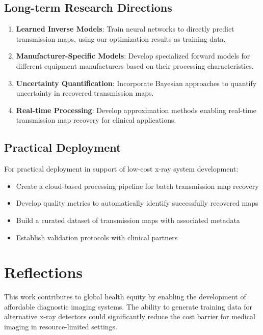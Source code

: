 \documentclass[nomenclature, english, bibtex]{kththesis}
\numberwithin{listing}{chapter}
\begin{document}
\subsection{Long-term Research Directions}
\begin{enumerate}
    \item \textbf{Learned Inverse Models}: Train neural networks to directly predict transmission maps, using our optimization results as training data.

    \item \textbf{Manufacturer-Specific Models}: Develop specialized forward models for different equipment manufacturers based on their processing characteristics.

    \item \textbf{Uncertainty Quantification}: Incorporate Bayesian approaches to quantify uncertainty in recovered transmission maps.

    \item \textbf{Real-time Processing}: Develop approximation methods enabling real-time transmission map recovery for clinical applications.
\end{enumerate}

\subsection{Practical Deployment}
For practical deployment in support of low-cost x-ray system development:
\begin{itemize}
    \item Create a cloud-based processing pipeline for batch transmission map recovery
    \item Develop quality metrics to automatically identify successfully recovered maps
    \item Build a curated dataset of transmission maps with associated metadata
    \item Establish validation protocols with clinical partners
\end{itemize}

\section{Reflections}
\label{sec:reflections}

This work contributes to global health equity by enabling the development of affordable diagnostic imaging systems. The ability to generate training data for alternative x-ray detectors could significantly reduce the cost barrier for medical imaging in resource-limited settings.
\end{document}
